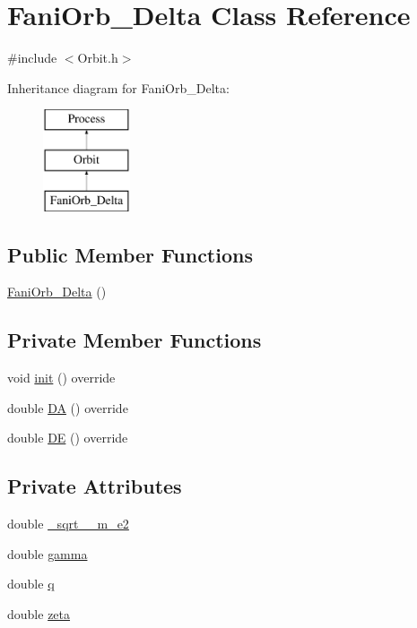 \hypertarget{class_fani_orb___delta}{}\section{Fani\+Orb\+\_\+\+Delta Class Reference}
\label{class_fani_orb___delta}


{\ttfamily \#include $<$Orbit.\+h$>$}

Inheritance diagram for Fani\+Orb\+\_\+\+Delta\+:\begin{figure}[H]
\begin{center}
\leavevmode
\includegraphics[height=3.000000cm]{class_fani_orb___delta}
\end{center}
\end{figure}
\subsection*{Public Member Functions}
\begin{DoxyCompactItemize}
\item 
\hyperlink{class_fani_orb___delta_ab94ffcdcf6fe420db3e860e4d24eb0f6}{Fani\+Orb\+\_\+\+Delta} ()
\end{DoxyCompactItemize}
\subsection*{Private Member Functions}
\begin{DoxyCompactItemize}
\item 
void \hyperlink{class_fani_orb___delta_aaec6b2158b730146f8b7bca6edb71c35}{init} () override
\item 
double \hyperlink{class_fani_orb___delta_ad61e16d6c8f9a2b11940bc21d1362e9c}{DA} () override
\item 
double \hyperlink{class_fani_orb___delta_a24ebee89e909be8bdfee96614d88304c}{DE} () override
\end{DoxyCompactItemize}
\subsection*{Private Attributes}
\begin{DoxyCompactItemize}
\item 
double \hyperlink{class_fani_orb___delta_a8272eead44837c161e6c68a0da6776a9}{\+\_\+sqrt\+\_\+\_\+m\+\_\+e2}
\item 
double \hyperlink{class_fani_orb___delta_a7d6d54645ba51c9b8ad22c456d93dd9f}{gamma}
\item 
double \hyperlink{class_fani_orb___delta_a2371cae5b3926e9320b6a566ae7475e1}{q}
\item 
double \hyperlink{class_fani_orb___delta_abedf4a744d0de675f0ee6e64806f46ee}{zeta}
\end{DoxyCompactItemize}
